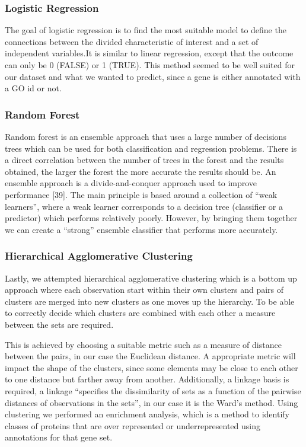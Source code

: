 \documentclass[9pt]{article}
\begin{document}
\subsubsection{Logistic Regression}
The goal of logistic regression is to find the most suitable model to define the connections between the divided characteristic of interest and a set of independent variables.It is similar to linear regression, except that the outcome can only be 0 (FALSE) or 1 (TRUE). This method seemed to be well suited for our dataset and what we wanted to predict, since a gene is either annotated with a GO id or not.

\subsubsection{Random Forest}
Random forest is an ensemble approach that uses a large number of decisions trees which can be used for both classification and regression problems. There is a direct correlation between the number of trees in the forest and the results obtained, the larger the forest the more accurate the results should be. An ensemble approach is a divide-and-conquer approach used to improve performance [39]. The main principle is based around a collection of “weak learners”, where a weak learner corresponds to a decision tree (classifier or a predictor) which performs relatively poorly. However, by bringing them together we can create a “strong” ensemble classifier that performs more accurately. 

\subsubsection{Hierarchical Agglomerative Clustering}
Lastly, we attempted hierarchical agglomerative clustering which is a bottom up approach where each observation start within their own clusters and pairs of clusters are merged into new clusters as one moves up the hierarchy. To be able to correctly decide which clusters are combined with each other a measure between the sets are required. 

This is achieved by choosing a suitable metric such as a measure of distance between the pairs, in our case the Euclidean distance. A appropriate metric will impact the shape of the clusters, since some elements may be close to each other to one distance but farther away from another. Additionally, a linkage basis is required, a linkage “specifies the dissimilarity of sets as a function of the pairwise distances of observations in the sets”, in our case it is the Ward’s method.  Using clustering we performed an enrichment analysis, which is a method to identify classes of proteins that are over represented or underrepresented using annotations for that gene set. 
\end{document}
